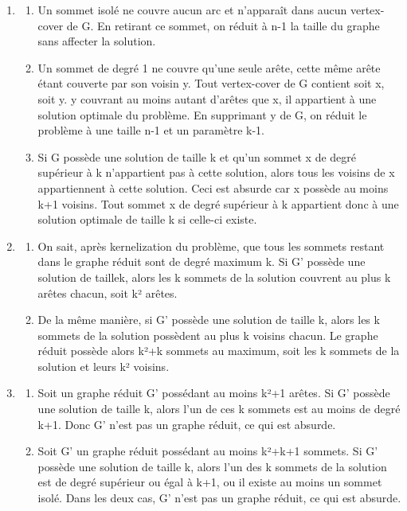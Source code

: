 \documentclass[]{article}
\begin{document}
\begin{enumerate}
\item 
\begin{enumerate}
\item Un sommet isolé ne couvre aucun arc et n'apparaît dans aucun vertex-cover de G. En retirant ce sommet, on réduit à n-1 la taille du graphe sans affecter la solution.\\
\item Un sommet de degré 1 ne couvre qu'une seule arête, cette même arête étant couverte par son voisin y. Tout vertex-cover de G contient soit x, soit y. y couvrant au moins autant d'arêtes que x, il appartient à une solution optimale du problème. En supprimant y de G, on réduit le problème à une taille n-1 et un paramètre k-1.\\
\item Si G possède une solution de taille k et qu'un sommet x de degré supérieur à k n'appartient pas à cette solution, alors tous les voisins de x appartiennent à cette solution. Ceci est absurde car x possède au moins k+1 voisins. Tout sommet x de degré supérieur à k appartient donc à une solution optimale de taille k si celle-ci existe. 
\end{enumerate}
\item
\begin{enumerate}
\item On sait, après kernelization du problème, que tous les sommets restant dans le graphe réduit sont de degré maximum k. Si G' possède une solution de taillek, alors les k sommets de la solution couvrent au plus k arêtes chacun, soit k² arêtes.\\
\item De la même manière, si G' possède une solution de taille k, alors les k sommets de la solution possèdent au plus k voisins chacun. Le graphe réduit possède alors k²+k sommets au maximum, soit les k sommets de la solution et leurs k² voisins.\\
\end{enumerate}
\item 
\begin{enumerate}
\item Soit un graphe réduit G' possédant au moins k²+1 arêtes. Si G' possède une solution de taille k, alors l'un de  ces k sommets est au moins de degré k+1. Donc G' n'est pas un graphe réduit, ce qui est absurde.\\
\item Soit G' un graphe réduit possédant au moins k²+k+1 sommets. Si G' possède une solution de taille k, alors l'un des k sommets de la solution est de degré supérieur ou égal à k+1, ou il existe au moins un sommet isolé. Dans les deux cas, G' n'est pas un graphe réduit, ce qui est absurde.

\end{enumerate}
\end{enumerate}
\end{document}
